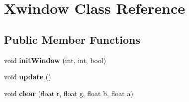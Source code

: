 \hypertarget{classXwindow}{\section{Xwindow Class Reference}
\label{classXwindow}
}
\subsection*{Public Member Functions}
\begin{DoxyCompactItemize}
\item 
\hypertarget{classXwindow_aabda1936338a108894e2c6ac00832f80}{void {\bfseries init\-Window} (int, int, bool)}\label{classXwindow_aabda1936338a108894e2c6ac00832f80}

\item 
\hypertarget{classXwindow_a271269bda174e784dfc47c03dd8d817f}{void {\bfseries update} ()}\label{classXwindow_a271269bda174e784dfc47c03dd8d817f}

\item 
\hypertarget{classXwindow_a764c6ee89f09c3f3d8967c0b1fab864c}{void {\bfseries clear} (float r, float g, float b, float a)}\label{classXwindow_a764c6ee89f09c3f3d8967c0b1fab864c}

\end{DoxyCompactItemize}
